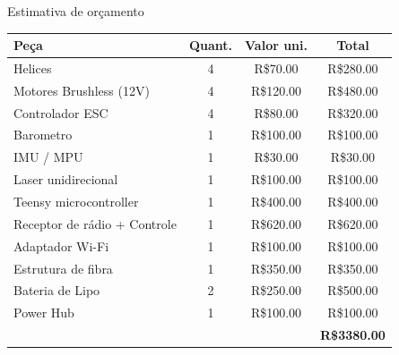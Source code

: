 \begin{frame}[t]{Estimativa de orçamento}
    \transboxout[duration=0.5]
    \centering

    \begin{tabular}{ l|c|c|c }
      \textbf{Peça}                & \textbf{Quant.} & \textbf{Valor uni.} & \textbf{Total} \\ \hline
      Helices                      &        4        &      R\$70.00       &   R\$280.00    \\
      Motores Brushless (12V)      &        4        &      R\$120.00      &   R\$480.00    \\
      Controlador ESC              &        4        &      R\$80.00       &   R\$320.00    \\
      Barometro                    &        1        &      R\$100.00      &   R\$100.00    \\
      IMU / MPU                    &        1        &      R\$30.00       &    R\$30.00    \\
      Laser unidirecional          &        1        &      R\$100.00      &   R\$100.00    \\
      Teensy microcontroller       &        1        &      R\$400.00      &   R\$400.00    \\
      Receptor de rádio + Controle &        1        &      R\$620.00      &   R\$620.00    \\
      Adaptador Wi-Fi              &        1        &      R\$100.00      &   R\$100.00    \\
      Estrutura de fibra           &        1        &      R\$350.00      &   R\$350.00    \\
      Bateria de Lipo              &        2        &      R\$250.00      &   R\$500.00    \\
      Power Hub                    &        1        &      R\$100.00      &   R\$100.00    \\ \hline
                                   &                 &                     &   \textbf{R\$3380.00}
    \end{tabular}

\end{frame}
